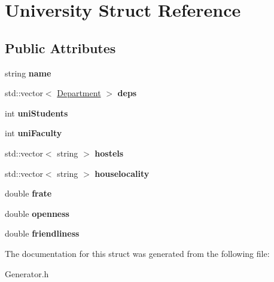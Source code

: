 \hypertarget{struct_university}{\section{University Struct Reference}
\label{struct_university}
}
\subsection*{Public Attributes}
\begin{DoxyCompactItemize}
\item 
\hypertarget{struct_university_a2a8af7dfd2ed7333922f6e2e94cd19a5}{string {\bfseries name}}\label{struct_university_a2a8af7dfd2ed7333922f6e2e94cd19a5}

\item 
\hypertarget{struct_university_a0f949de008bbacae02bd5d6ae617ee8d}{std\-::vector$<$ \hyperlink{struct_department}{Department} $>$ {\bfseries deps}}\label{struct_university_a0f949de008bbacae02bd5d6ae617ee8d}

\item 
\hypertarget{struct_university_aaeae5cc245e28d84815f65d867531557}{int {\bfseries uni\-Students}}\label{struct_university_aaeae5cc245e28d84815f65d867531557}

\item 
\hypertarget{struct_university_aa4f30e9c1164ddc9b1e87ebceeae2f24}{int {\bfseries uni\-Faculty}}\label{struct_university_aa4f30e9c1164ddc9b1e87ebceeae2f24}

\item 
\hypertarget{struct_university_a026caf2f045b5044141bc4aa2f622a7f}{std\-::vector$<$ string $>$ {\bfseries hostels}}\label{struct_university_a026caf2f045b5044141bc4aa2f622a7f}

\item 
\hypertarget{struct_university_ace7dd19b501c1bf295e4679cbac05267}{std\-::vector$<$ string $>$ {\bfseries houselocality}}\label{struct_university_ace7dd19b501c1bf295e4679cbac05267}

\item 
\hypertarget{struct_university_a481d63792f1c496697f0a04707ae630d}{double {\bfseries frate}}\label{struct_university_a481d63792f1c496697f0a04707ae630d}

\item 
\hypertarget{struct_university_a02cd8328b7317369f988d173a001e768}{double {\bfseries openness}}\label{struct_university_a02cd8328b7317369f988d173a001e768}

\item 
\hypertarget{struct_university_a3fae33e8b19addddfaa18a2754831f0c}{double {\bfseries friendliness}}\label{struct_university_a3fae33e8b19addddfaa18a2754831f0c}

\end{DoxyCompactItemize}


The documentation for this struct was generated from the following file\-:\begin{DoxyCompactItemize}
\item 
Generator.\-h\end{DoxyCompactItemize}
